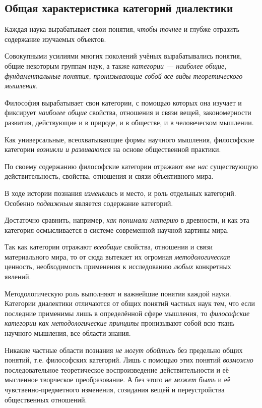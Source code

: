 \documentclass[a4paper,14pt,russian]{extreport}
\begin{document}
\subsection{Общая характеристика категорий диалектики}

Каждая наука вырабатывает свои понятия, \emph{чтобы точнее} и глубже отразить содержание изучаемых объектов.

Совокупными усилиями многих поколений учёных вырабатывались понятия, общие некоторым группам наук, а также \emph{категории --- наиболее общие, фундаментальные понятия, пронизывающие собой все виды теоретического мышления}.

Философия вырабатывает свои категории, с помощью которых она изучает и фиксирует \emph{наиболее общие} свойства, отношения и связи вещей, закономерности развития, действующие и в природе, и в обществе, и в человеческом мышлении.

Как универсальные, всеохватывающие формы научного мышления, философские категории \emph{возникли и развиваются} на основе общественной практики.

По своему содержанию философские категории отражают \emph{вне нас} существующую действительность, свойства, отношения и связи объективного мира.

В ходе истории познания \emph{изменялись} и место, и роль отдельных категорий. Особенно \emph{подвижным} является содержание категорий.

Достаточно сравнить, например, \emph{как понимали} \emph{материю} в древности, и как эта категория осмысливается в системе современной научной картины мира.

Так как категории отражают \emph{всеобщие} свойства, отношения и связи материального мира, то от сюда вытекает их огромная \emph{методологическая} ценность, необходимость применения к исследованию \emph{любых} конкретных явлений.

Методологическую роль выполняют и важнейшие понятия каждой науки. Категории диалектики отличаются от общих понятий частных наук тем, что если последние применимы лишь в определённой сфере мышления, то \emph{философские категории как методологические принципы} пронизывают собой всю ткань научного мышления, все области знания.

Никакие частные области познания \emph{не могут обойтись} без предельно общих понятий, т.е. философских категорий. Лишь с помощью этих понятий \emph{возможно} последовательное теоретическое воспроизведение действительности и её мысленное творческое преобразование. А без этого \emph{не может быть} и её чувственно-предметного изменения, созидания вещей и переустройства общественных отношений.
\end{document}
